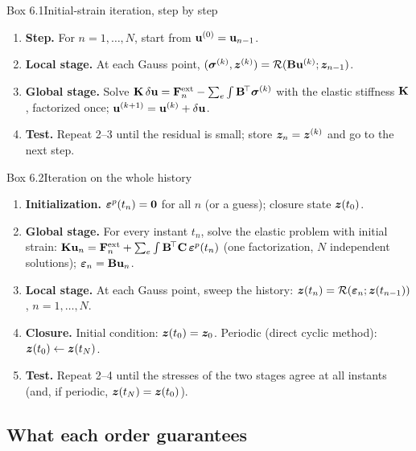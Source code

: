 \begin{gbox}{Box 6.1\quad Initial-strain iteration, step by step}
%
\begin{enumerate}[label=\textbf{\arabic*.},leftmargin=1.6em]
  \item \textbf{Step.} For $n=1,\dots,N$, start from $\mathbf{u}^{(0)}=\mathbf{u}_{n-1}$.
  \item \textbf{Local stage.} At each Gauss point,
  $(\bm{\sigma}^{(k)},\bm{z}^{(k)})=\mathcal R(\mathbf{B}\mathbf{u}^{(k)};\bm{z}_{n-1})$.
  \item \textbf{Global stage.} Solve
  $\mathbf{K}\,\delta\mathbf{u}=\mathbf{F}^{\mathrm{ext}}_n-\sum_e\int\mathbf{B}^{\!\top}\bm{\sigma}^{(k)}$
  with the elastic stiffness $\mathbf{K}$, factorized once;
  $\mathbf{u}^{(k+1)}=\mathbf{u}^{(k)}+\delta\mathbf{u}$.
  \item \textbf{Test.} Repeat 2--3 until the residual is small; store
  $\bm{z}_n=\bm{z}^{(k)}$ and go to the next step.
\end{enumerate}
\end{gbox}

\begin{gbox}{Box 6.2\quad Iteration on the whole history}
%
\begin{enumerate}[label=\textbf{\arabic*.},leftmargin=1.6em]
  \item \textbf{Initialization.} $\bm{\varepsilon}^{p}(t_n)=\bm{0}$ for all $n$ (or a guess);
  closure state $\bm{z}(t_0)$.
  \item \textbf{Global stage.} For every instant $t_n$, solve the elastic problem
  with initial strain: $\mathbf{K}\mathbf{u}_n=\mathbf{F}^{\mathrm{ext}}_n+\sum_e\int\mathbf{B}^{\!\top}\mathbf{C}\,\bm{\varepsilon}^{p}(t_n)$
  (one factorization, $N$ independent solutions); $\bm{\varepsilon}_n=\mathbf{B}\mathbf{u}_n$.
  \item \textbf{Local stage.} At each Gauss point, sweep the history:
  $\bm{z}(t_n)=\mathcal R(\bm{\varepsilon}_n;\bm{z}(t_{n-1}))$, $n=1,\dots,N$.
  \item \textbf{Closure.} Initial condition: $\bm{z}(t_0)=\bm{z}_0$. Periodic
  (direct cyclic method): $\bm{z}(t_0)\gets\bm{z}(t_N)$.
  \item \textbf{Test.} Repeat 2--4 until the stresses of the two stages agree
  at all instants (and, if periodic, $\bm{z}(t_N)=\bm{z}(t_0)$).
\end{enumerate}
\end{gbox}

\subsection{What each order guarantees}
